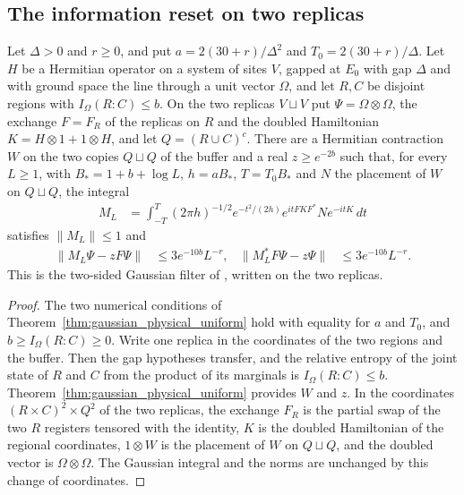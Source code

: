 \subsection{The information reset on two replicas}
\label{sec:gaussian_regional_reset}

\begin{theorem}
    \label{thm:gaussian_regional_filter}
    \leanok
    Let $\Delta>0$ and $r\ge0$, and put $a=2(30+r)/\Delta^2$ and $T_0=2(30+r)/\Delta$.
    Let $H$ be a Hermitian operator on a system of sites $V$, gapped at $E_0$ with gap
    $\Delta$ and with ground space the line through a unit vector $\Omega$, and let
    $R,C$ be disjoint regions with $I_\Omega(R:C)\le b$. On the two replicas
    $V\sqcup V$ put $\Psi=\Omega\otimes\Omega$, the exchange $F=F_R$ of the replicas on
    $R$ and the doubled Hamiltonian $K=H\otimes1+1\otimes H$, and let
    $Q=(R\cup C)^c$. There are a Hermitian contraction $W$ on the two copies
    $Q\sqcup Q$ of the buffer and a real $z\ge e^{-2b}$ such that, for every $L\ge1$,
    with $B_*=1+b+\log L$, $h=aB_*$, $T=T_0B_*$ and $N$ the placement of $W$ on
    $Q\sqcup Q$, the integral
    \begin{align}
        M_L&=\int_{-T}^{T}(2\pi h)^{-1/2}e^{-t^2/(2h)}
            e^{itFKF^*}Ne^{-itK}\,dt
    \end{align}
    satisfies $\|M_L\|\le1$ and
    \begin{align}
        \|M_L\Psi-zF\Psi\|&\le3e^{-10b}L^{-r}, &
        \|M_L^*F\Psi-z\Psi\|&\le3e^{-10b}L^{-r}.
    \end{align}
    This is the two-sided Gaussian filter of
    \cite[Lemma~3.3]{OpenAI2026PolynomialPEPS}, written on the two replicas.
\end{theorem}
\begin{proof}\leanok
    The two numerical conditions of Theorem~\ref{thm:gaussian_physical_uniform} hold
    with equality for $a$ and $T_0$, and $b\ge I_\Omega(R:C)\ge0$. Write one replica
    in the coordinates of the two regions and the buffer. Then the gap hypotheses
    transfer, and the relative entropy of the joint state of $R$ and $C$ from the
    product of its marginals is $I_\Omega(R:C)\le b$. Theorem~\ref{thm:gaussian_physical_uniform}
    provides $W$ and $z$. In the coordinates $(R\times C)^2\times Q^2$ of the two
    replicas, the exchange $F_R$ is the partial swap of the two $R$ registers tensored
    with the identity, $K$ is the doubled Hamiltonian of the regional coordinates,
    $1\otimes W$ is the placement of $W$ on $Q\sqcup Q$, and the doubled vector is
    $\Omega\otimes\Omega$. The Gaussian integral and the norms are unchanged by this
    change of coordinates.
\end{proof}


